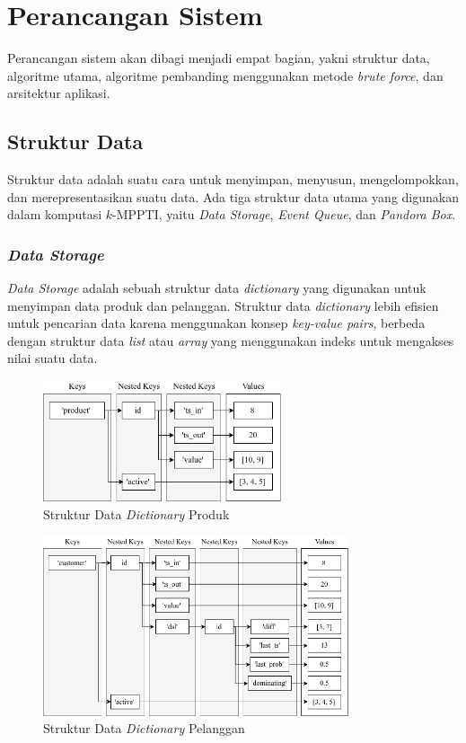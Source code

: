 \section{Perancangan Sistem}
\tab Perancangan sistem akan dibagi menjadi empat bagian, yakni struktur data, algoritme utama, algoritme pembanding menggunakan metode \textit{brute force}, dan arsitektur aplikasi. 

\subsection{Struktur Data}
\tab Struktur data adalah suatu cara untuk menyimpan, menyusun, mengelompokkan, dan merepresentasikan suatu data. Ada tiga struktur data utama yang digunakan dalam komputasi $k$-MPPTI, yaitu \textit{Data Storage}, \textit{Event Queue}, dan \textit{Pandora Box}.

\subsubsection{\textit{Data Storage}}
\tab \textit{Data Storage} adalah sebuah struktur data \textit{dictionary} yang digunakan untuk menyimpan data produk dan pelanggan. Struktur data \textit{dictionary} lebih efisien untuk pencarian data karena menggunakan konsep \textit{key-value pairs}, berbeda dengan struktur data \textit{list} atau \textit{array} yang menggunakan indeks untuk mengakses nilai suatu data.

\begin{figure}[H]
	\centering
	\includegraphics[width=7cm]{bab3/img/sd1.png}
	\caption{Struktur Data \textit{Dictionary} Produk}
	\label{fig:sd1}
\end{figure}

\begin{figure}[H]
	\centering
	\includegraphics[width=9cm]{bab3/img/sd2.png}
	\caption{Struktur Data \textit{Dictionary} Pelanggan}
	\label{fig:sd2}
\end{figure}

